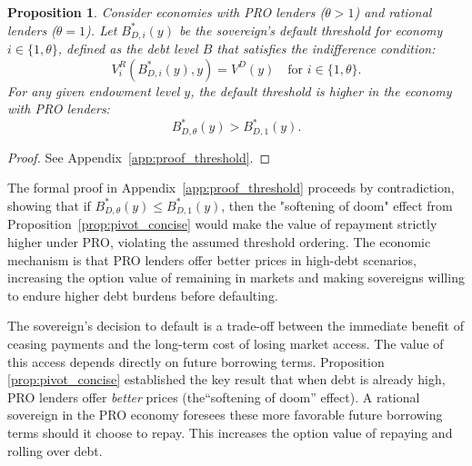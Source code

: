 \documentclass[12pt]{article}
\theoremstyle{plain}
\newtheorem{proposition}{Proposition}
\begin{document}
\begin{proposition}
	\label{prop:threshold}
	Consider economies with PRO lenders ($\theta > 1$) and rational lenders ($\theta = 1$). Let $B^*_{D,i}(y)$ be the sovereign's default threshold for economy $i \in \{1, \theta\}$, defined as the debt level $B$ that satisfies the indifference condition:
	\begin{equation}
		V^R_i(B^*_{D,i}(y),y) = V^D(y) \quad \text{for } i \in \{1, \theta\}.
		\label{eq:default_threshold_definition}
	\end{equation}
	For any given endowment level $y$, the default threshold is higher in the economy with PRO lenders:
	\begin{equation*}
		B^*_{D,\theta}(y) > B^*_{D,1}(y).
	\end{equation*}
\end{proposition}

\begin{proof}
	See Appendix~\ref{app:proof_threshold}.
\end{proof}
The formal proof in Appendix~\ref{app:proof_threshold} proceeds by contradiction, showing that if $B^*_{D,\theta}(y) \leq B^*_{D,1}(y)$, then the "softening of doom" effect from Proposition~\ref{prop:pivot_concise} would make the value of repayment strictly higher under PRO, violating the assumed threshold ordering. The economic mechanism is that PRO lenders offer better prices in high-debt scenarios, increasing the option value of remaining in markets and making sovereigns willing to endure higher debt burdens before defaulting.

The sovereign's decision to default is a trade-off between the immediate
benefit of ceasing payments and the long-term cost of losing market access. The
value of this access depends directly on future borrowing terms. Proposition
\ref{prop:pivot_concise} established the key result that when debt is already
high, PRO lenders offer \textit{better} prices (the``softening of doom''
effect). A rational sovereign in the PRO economy foresees these more favorable
future borrowing terms should it choose to repay. This increases the option
value of repaying and rolling over debt.
\end{document}
